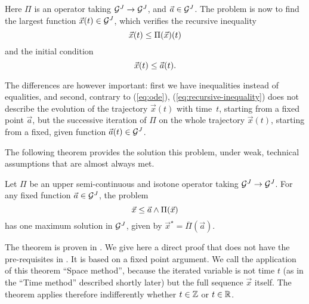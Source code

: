 Here $\Pi$ is an operator taking $\mathcal G^J \rightarrow \mathcal G^J$, and $\vec{a} \in \mathcal G^J$. The problem is now to find the largest function
$\vec{x}(t) \in \mathcal G^J$, which verifies the recursive inequality
\begin{equation}
\mylabel{eq:recursive-inequality}
\vec{x}(t) \leq \Pi(\vec{x})(t)
\end{equation}
and the initial condition
\begin{equation}
\mylabel{eq:recursive-init}
\vec{x}(t) \leq \vec{a}(t) .
\end{equation}

The differences are however important: first we have inequalities instead of equalities, and second, contrary to (\ref{eq:ode}), (\ref{eq:recursive-inequality}) does not describe the evolution of the trajectory $\vec{x}(t)$ with time~$t$, starting from a fixed point $\vec{a}$, but the successive iteration of $\Pi$ on the whole trajectory $\vec{x}(t)$, starting from a fixed, given function $\vec{a}(t) \in \mathcal G^J$.

The following theorem provides the solution this problem, under
weak, technical assumptions that are almost always met.
\begin{theorem}
Let $\Pi$ be an upper semi-continuous and isotone operator taking $\mathcal G^J \rightarrow \mathcal G^J$. For any fixed function $\vec{a} \in \mathcal G^{J}$, the problem
\begin{equation}
\mylabel{eq:fixedpoint}
\vec{x} \leq \vec{a} \wedge \Pi(\vec{x})
\end{equation}
has one maximum solution in $\mathcal G^J$, given by
$\vec{x}^{\star}=\overline{\Pi}(\vec{a})$.
\end{theorem}

The theorem is proven in \cite{maxPlus}. We give here a direct
proof that does not have the pre-requisites in \cite{maxPlus}. It
is based on a fixed point argument. We call the application of
this theorem ``Space method'', because the iterated variable is
not time $t$ (as in the ``Time method'' described shortly later)
but the full sequence $\vec{x}$ itself. The theorem applies
therefore indifferently whether $t \in \mathbb{Z}$ or $t \in \mathbb{R}$.

